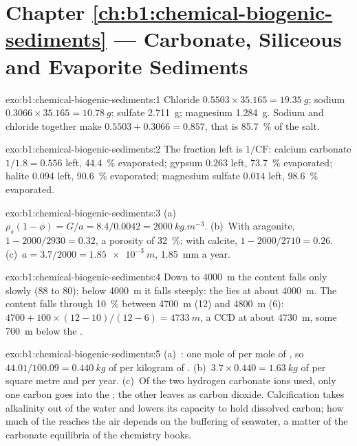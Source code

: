 \section*{Chapter \ref{ch:b1:chemical-biogenic-sediments} --- Carbonate, Siliceous and Evaporite Sediments}

\begin{solution}{exo:b1:chemical-biogenic-sediments:1}
Chloride $0.5503\times35.165 = \qty{19.35}{g}$; sodium $0.3066\times35.165 =
\qty{10.78}{g}$; sulfate \qty{2.711}{g}; magnesium \qty{1.284}{g}. Sodium and
chloride together make $0.5503 + 0.3066 = 0.857$, that is \qty{85.7}{\%} of the
salt.
\end{solution}

\begin{solution}{exo:b1:chemical-biogenic-sediments:2}
The fraction left is $1/\mathrm{CF}$: calcium carbonate $1/1.8 = 0.556$ left,
\qty{44.4}{\%} evaporated; gypsum $0.263$ left, \qty{73.7}{\%} evaporated;
halite $0.094$ left, \qty{90.6}{\%} evaporated; magnesium sulfate $0.014$ left,
\qty{98.6}{\%} evaporated.
\end{solution}

\begin{solution}{exo:b1:chemical-biogenic-sediments:3}
(a)~$\rho_s(1-\phi) = G/a = 8.4/0.0042 = \qty{2000}{kg.m^{-3}}$. (b)~With
aragonite, $1 - 2000/2930 = 0.32$, a porosity of \qty{32}{\%}; with calcite,
$1 - 2000/2710 = 0.26$. (c)~$a = 3.7/2000 = \qty{1.85e-3}{m}$, \qty{1.85}{mm} a
year.
\end{solution}

\begin{solution}{exo:b1:chemical-biogenic-sediments:4}
Down to \qty{4000}{m} the content falls only slowly (88 to 80); below
\qty{4000}{m} it falls steeply: the  lies at about \qty{4000}{m}. The
content falls through \qty{10}{\%} between \qty{4700}{m} (12) and \qty{4800}{m}
(6): $4700 + 100\times(12-10)/(12-6) = \qty{4733}{m}$, a CCD at about
\qty{4730}{m}, some \qty{700}{m} below the .
\end{solution}

\begin{solution}{exo:b1:chemical-biogenic-sediments:5}
(a)~: one mole of  per mole of
, so $44.01/100.09 = \qty{0.440}{kg}$ of  per kilogram of
. (b)~$3.7\times0.440 = \qty{1.63}{kg}$ of  per square metre and
per year. (c)~Of the two hydrogen carbonate ions used, only one carbon goes into
the ; the other leaves as carbon dioxide. Calcification takes alkalinity
out of the water and lowers its capacity to hold dissolved carbon; how much of
the  reaches the air depends on the buffering of seawater, a matter of
the carbonate equilibria of the chemistry books.
\end{solution}

